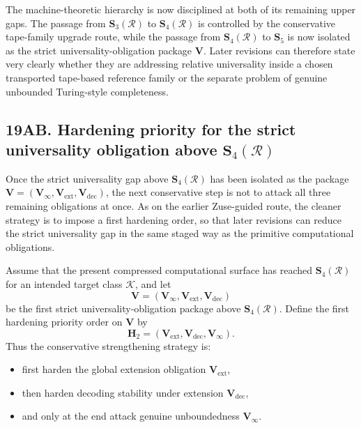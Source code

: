 \begin{corollary}
The machine-theoretic hierarchy is now disciplined at both of its remaining upper gaps. The passage from \(\mathbf S_3(\mathcal R)\) to \(\mathbf S_4(\mathcal R)\) is controlled by the conservative tape-family upgrade route, while the passage from \(\mathbf S_4(\mathcal R)\) to \(\mathbf S_5\) is now isolated as the strict universality-obligation package \(\mathbf V\). Later revisions can therefore state very clearly whether they are addressing relative universality inside a chosen transported tape-based reference family or the separate problem of genuine unbounded Turing-style completeness.
\end{corollary}


\subsection*{19AB. Hardening priority for the strict universality obligation above \(\mathbf S_4(\mathcal R)\)}
Once the strict universality gap above \(\mathbf S_4(\mathcal R)\) has been isolated as the package \(\mathbf V=(\mathbf V_\infty,\mathbf V_{\mathrm{ext}},\mathbf V_{\mathrm{dec}})\), the next conservative step is not to attack all three remaining obligations at once. As on the earlier Zuse-guided route, the cleaner strategy is to impose a first hardening order, so that later revisions can reduce the strict universality gap in the same staged way as the primitive computational obligations.

\begin{definition}
Assume that the present compressed computational surface has reached \(\mathbf S_4(\mathcal R)\) for an intended target class \(\mathcal K\), and let
\[
\mathbf V=(\mathbf V_\infty,\mathbf V_{\mathrm{ext}},\mathbf V_{\mathrm{dec}})
\]
be the first strict universality-obligation package above \(\mathbf S_4(\mathcal R)\).
Define the first hardening priority order on \(\mathbf V\) by
\[
\mathbf H_2=(\mathbf V_{\mathrm{ext}},\mathbf V_{\mathrm{dec}},\mathbf V_\infty).
\]
Thus the conservative strengthening strategy is:
\begin{itemize}[leftmargin=2em]
 \item first harden the global extension obligation \(\mathbf V_{\mathrm{ext}}\),
 \item then harden decoding stability under extension \(\mathbf V_{\mathrm{dec}}\),
 \item and only at the end attack genuine unboundedness \(\mathbf V_\infty\).
\end{itemize}
\end{definition}

